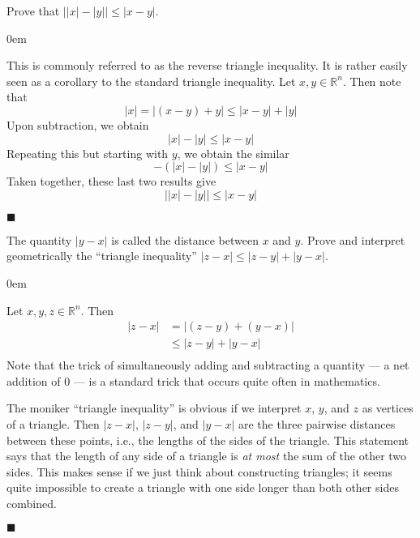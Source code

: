 \documentclass[12pt]{article}
\renewcommand{\qed}{\hfill$\blacksquare$}
\renewenvironment{proof}{\begin{addmargin}[1em]{0em}\begin{newproof}}{\end{newproof}\end{addmargin}\qed}
\newenvironment{problem}[2][Problem]{\begin{trivlist}
\item[\hskip \labelsep {\bfseries #1}\hskip \labelsep {\bfseries #2.}]}{\end{trivlist}}
\begin{document}
\begin{problem}{1.4}
Prove that $\left| \left|x\right|- \left|y\right| \right| \leq \left|x-y\right|$. 
\end{problem}

\begin{proof}
This is commonly referred to as the reverse triangle inequality. It is rather easily seen as a corollary to the standard triangle inequality. Let $x,y \in \mathbb{R}^n$. Then note that
$$ \left| x\right| = \left| \left(x-y\right) + y \right| \leq \left|x-y\right| + \left|y\right| $$ Upon subtraction, we obtain
$$ \left|x\right| - \left|y\right| \leq \left|x-y\right| $$
Repeating this but starting with $y$, we obtain the similar
$$ - \left( \left|x\right| - \left|y\right| \right) \leq \left|x-y\right| $$
Taken together, these last two results give
$$ \left| \left|x\right| - \left|y\right| \right| \leq \left|x-y\right| $$
\end{proof}






\begin{problem}{1.5}
The quantity $\left|y-x\right|$ is called the distance between $x$ and $y$. Prove and interpret geometrically the ``triangle inequality'' $\left|z-x\right| \leq \left|z-y\right| + \left|y-x\right|$.
\end{problem}

\begin{proof}
Let $x,y,z \in \mathbb{R}^n$. Then
\begin{equation*}
\begin{split}
\left|z-x\right| & = \left| \left(z-y\right) + \left(y-x\right) \right| \\
& \leq \left|z-y\right| + \left|y-x\right| \\
\end{split}
\end{equation*}
Note that the trick of simultaneously adding and subtracting a quantity --- a net addition of 0 --- is a standard trick that occurs quite often in mathematics.

The moniker ``triangle inequality'' is obvious if we interpret $x$, $y$, and $z$ as vertices of a triangle. Then $\left|z-x\right|$, $\left|z-y\right|$, and $\left|y-x\right|$ are the three pairwise distances between these points, i.e., the lengths of the sides of the triangle. This statement says that the length of any side of a triangle is \textit{at most} the sum of the other two sides. This makes sense if we just think about constructing triangles; it seems quite impossible to create a triangle with one side longer than both other sides combined. 
\end{proof}
\end{document}
